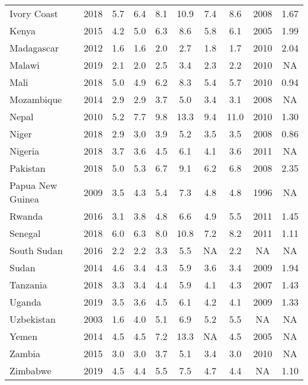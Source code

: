 \begin{table}[b]
{\begin{tabular}[t]{lccccccccc}
Ivory Coast & 2018 & 5.7 & 6.4 & 8.1 & 10.9 & 7.4 & 8.6 & 2008 & 1.67\\
Kenya & 2015 & 4.2 & 5.0 & 6.3 & 8.6 & 5.8 & 6.1 & 2005 & 1.99\\
Madagascar & 2012 & 1.6 & 1.6 & 2.0 & 2.7 & 1.8 & 1.7 & 2010 & 2.04\\
Malawi & 2019 & 2.1 & 2.0 & 2.5 & 3.4 & 2.3 & 2.2 & 2010 & NA\\
Mali & 2018 & 5.0 & 4.9 & 6.2 & 8.3 & 5.4 & 5.7 & 2010 & 0.94\\
Mozambique & 2014 & 2.9 & 2.9 & 3.7 & 5.0 & 3.4 & 3.1 & 2008 & NA\\
Nepal & 2010 & 5.2 & 7.7 & 9.8 & 13.3 & 9.4 & 11.0 & 2010 & 1.30\\
Niger & 2018 & 2.9 & 3.0 & 3.9 & 5.2 & 3.5 & 3.5 & 2008 & 0.86\\
Nigeria & 2018 & 3.7 & 3.6 & 4.5 & 6.1 & 4.1 & 3.6 & 2011 & NA\\
Pakistan & 2018 & 5.0 & 5.3 & 6.7 & 9.1 & 6.2 & 6.8 & 2008 & 2.35\\
Papua New Guinea & 2009 & 3.5 & 4.3 & 5.4 & 7.3 & 4.8 & 4.8 & 1996 & NA\\
Rwanda & 2016 & 3.1 & 3.8 & 4.8 & 6.6 & 4.9 & 5.5 & 2011 & 1.45\\
Senegal & 2018 & 6.0 & 6.3 & 8.0 & 10.8 & 7.2 & 8.2 & 2011 & 1.11\\
South Sudan & 2016 & 2.2 & 2.2 & 3.3 & 5.5 & NA & 2.2 & NA & NA\\
Sudan & 2014 & 4.6 & 3.4 & 4.3 & 5.9 & 3.6 & 3.4 & 2009 & 1.94\\
Tanzania & 2018 & 3.3 & 3.4 & 4.4 & 5.9 & 4.1 & 4.3 & 2007 & 1.43\\
Uganda & 2019 & 3.5 & 3.6 & 4.5 & 6.1 & 4.2 & 4.1 & 2009 & 1.33\\
Uzbekistan & 2003 & 1.6 & 4.0 & 5.1 & 6.9 & 5.2 & 5.5 & NA & NA\\
Yemen & 2014 & 4.5 & 4.5 & 7.2 & 13.3 & NA & 4.5 & 2005 & NA\\
Zambia & 2015 & 3.0 & 3.0 & 3.7 & 5.1 & 3.4 & 3.0 & 2010 & NA\\
Zimbabwe & 2019 & 4.5 & 4.4 & 5.5 & 7.5 & 4.7 & 4.4 & NA & 1.10\\
\bottomrule
\end{tabular}}
\end{table}
